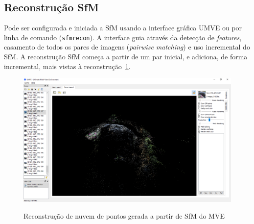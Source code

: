 \subsection{Reconstrução SfM}

Pode ser configurada e iniciada a SfM usando a interface gráfica UMVE ou por linha de
comando (\texttt{sfmrecon}). A interface guia através da detecção de
\emph{features}, casamento de todos os pares de imagens (\emph{pairwise matching}) e uso
incremental do SfM. A reconstrução SfM começa a partir de um
par inicial, e adiciona, de forma incremental, mais vistas à
reconstrução~\ref{fig:mvesfm}.

\newpage

\begin{figure}[!h]
	\centering
		\caption{%
  Reconstrução de nuvem de pontos gerada a partir de
  SfM do MVE%
	}
	\includegraphics[width=\linewidth]{figs/umve5sfm.png}
	\label{fig:mvesfm}
\end{figure}


%
